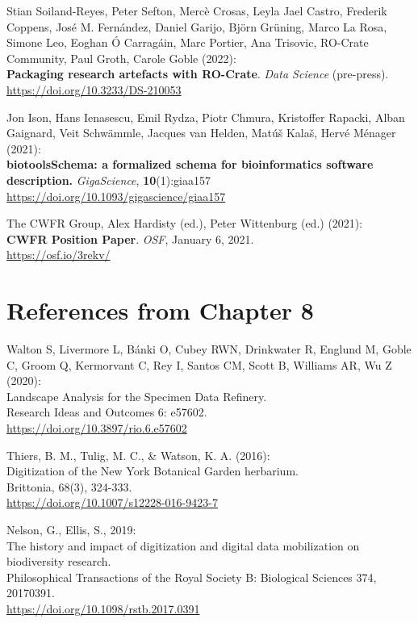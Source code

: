 \begin{thebibliography}{9}
Stian Soiland-Reyes, Peter Sefton, Mercè Crosas, Leyla Jael
Castro, Frederik Coppens, José M. Fernández, Daniel Garijo, Björn
Grüning, Marco La Rosa, Simone Leo, Eoghan Ó Carragáin, Marc Portier,
Ana Trisovic, RO-Crate Community, Paul Groth, Carole Goble (2022):\\
\textbf{Packaging research artefacts with RO-Crate}. \emph{Data Science}
(pre-press).\\
\url{https://doi.org/10.3233/DS-210053}

Jon Ison, Hans Ienasescu, Emil Rydza, Piotr Chmura, Kristoffer
Rapacki, Alban Gaignard, Veit Schwämmle, Jacques van Helden, Matúš
Kalaš, Hervé Ménager (2021):\\
\textbf{biotoolsSchema: a formalized schema for bioinformatics software
description.} \emph{GigaScience}, \textbf{10}(1):giaa157\\
\url{https://doi.org/10.1093/gigascience/giaa157}

The CWFR Group, Alex Hardisty (ed.), Peter Wittenburg (ed.)
(2021):\\
\textbf{CWFR Position Paper}. \emph{OSF}, January 6, 2021.\\
\url{https://osf.io/3rekv/}



\section{References from Chapter 8}

Walton S, Livermore L, Bánki O, Cubey RWN, Drinkwater R, Englund
M, Goble C, Groom Q, Kermorvant C, Rey I, Santos CM, Scott B, Williams
AR, Wu Z (2020):\\
Landscape Analysis for the Specimen Data Refinery.\\
Research Ideas and Outcomes 6: e57602.\\
\url{https://doi.org/10.3897/rio.6.e57602}

Thiers, B. M., Tulig, M. C., \& Watson, K. A. (2016):\\
Digitization of the New York Botanical Garden herbarium.\\
Brittonia, 68(3), 324-333.\\
\url{https://doi.org/10.1007/s12228-016-9423-7}

Nelson, G., Ellis, S., 2019:\\
The history and impact of digitization and digital data mobilization on
biodiversity research.\\
Philosophical Transactions of the Royal Society B: Biological Sciences
374, 20170391.\\
\url{https://doi.org/10.1098/rstb.2017.0391}


\end{thebibliography}
